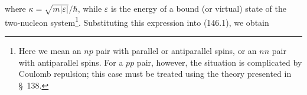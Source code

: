 where $\kappa=\sqrt{m|\varepsilon|}/\hbar$, while $\varepsilon$ is the energy of a bound (or virtual) state of the two-nucleon system\footnote{Here we mean an $np$ pair with parallel or antiparallel spins, or an $nn$ pair with antiparallel spins. For a $pp$ pair, however, the situation is complicated by Coulomb repulsion; this case must be treated using the theory presented in \S~138.}. Substituting this expression into (146.1), we obtain
